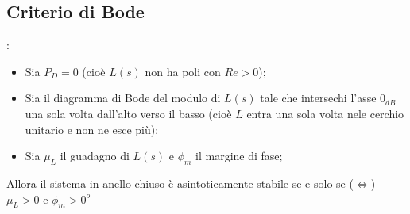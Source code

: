\begin{landscape}
    \subsection*{Criterio di Bode}:
    \begin{itemize}
        \item Sia $P_D = 0$ (cioè $L(s)$ non ha poli con $Re > 0$);
        \item Sia il diagramma di Bode del modulo di $L(s)$ tale che intersechi l'asse $0_{dB}$ una sola volta dall'alto verso il basso (cioè $L$ entra una sola volta nele cerchio unitario e non ne esce più);
        \item Sia $\mu_L$ il guadagno di $L(s)$ e $\phi_m$ il margine di fase;
    \end{itemize}
    Allora il sistema in anello chiuso è asintoticamente stabile se e solo se ($\Leftrightarrow$) $\mu_L > 0$ e $\phi_m > 0^o$
\end{landscape}
